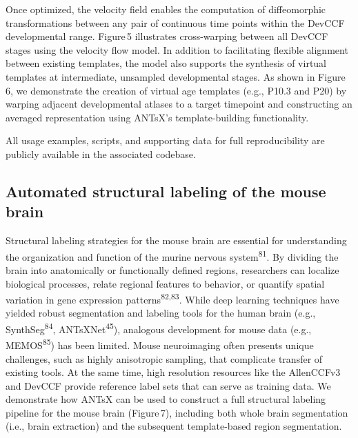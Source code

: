 \documentclass[
  12pt,
]{article}
\begin{document}
Once optimized, the velocity field enables the computation of
diffeomorphic transformations between any pair of continuous time points
within the DevCCF developmental range. Figure\,5 illustrates
cross-warping between all DevCCF stages using the velocity flow model.
In addition to facilitating flexible alignment between existing
templates, the model also supports the synthesis of virtual templates at
intermediate, unsampled developmental stages. As shown in Figure\,6, we
demonstrate the creation of virtual age templates (e.g., P10.3 and P20)
by warping adjacent developmental atlases to a target timepoint and
constructing an averaged representation using ANTsX's template-building
functionality.

All usage examples, scripts, and supporting data for full
reproducibility are publicly available in the associated codebase.

\subsection{Automated structural labeling of the mouse
brain}\label{automated-structural-labeling-of-the-mouse-brain}

Structural labeling strategies for the mouse brain are essential for
understanding the organization and function of the murine nervous
system\textsuperscript{81}. By dividing the brain into anatomically or
functionally defined regions, researchers can localize biological
processes, relate regional features to behavior, or quantify spatial
variation in gene expression patterns\textsuperscript{82,83}. While deep
learning techniques have yielded robust segmentation and labeling tools
for the human brain (e.g., SynthSeg\textsuperscript{84},
ANTsXNet\textsuperscript{45}), analogous development for mouse data
(e.g., MEMOS\textsuperscript{85}) has been limited. Mouse neuroimaging
often presents unique challenges, such as highly anisotropic sampling,
that complicate transfer of existing tools. At the same time, high
resolution resources like the AllenCCFv3 and DevCCF provide reference
label sets that can serve as training data. We demonstrate how ANTsX can
be used to construct a full structural labeling pipeline for the mouse
brain (Figure\,7), including both whole brain segmentation (i.e., brain
extraction) and the subsequent template-based region segmentation.
\end{document}
